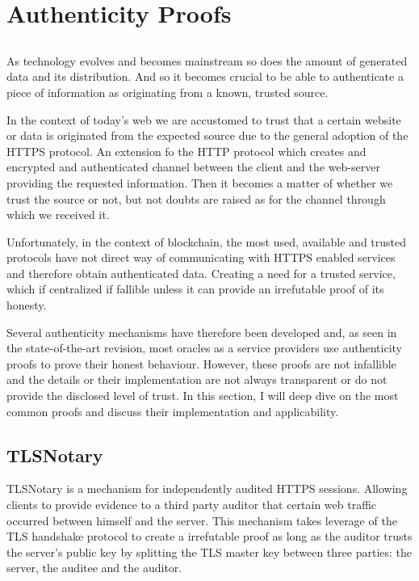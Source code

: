 \chapter{Authenticity Proofs}\label{chap:chap4}

\section*{}
As technology evolves and becomes mainstream so does the amount of generated data and its distribution. And so it becomes crucial to be able to authenticate a piece of information as originating from a known, trusted source. 

In the context of today's web we are accustomed to trust that a certain website or data is originated from the expected source due to the general adoption of the HTTPS protocol. An extension fo the HTTP protocol which creates and encrypted and authenticated channel between the client and the web-server providing the requested information. Then it becomes a matter of whether we trust the source or not, but not doubts are raised as for the channel through which we received it.

Unfortunately, in the context of blockchain, the most used, available and trusted protocols have not direct way of communicating with HTTPS enabled services and therefore obtain authenticated data. Creating a need for a trusted service, which if centralized if fallible unless it can provide an irrefutable proof of its honesty. 

Several authenticity mechanisms have therefore been developed and, as seen in the state-of-the-art revision, most oracles as a service providers use authenticity proofs to prove their honest behaviour. However, these proofs are not infallible and the details or their implementation are not always transparent or do not provide the disclosed level of trust. In this section, I will deep dive on the most common proofs and discuss their implementation and applicability.


\section{TLSNotary}

TLSNotary is a mechanism for independently audited HTTPS sessions. Allowing clients to provide evidence to a third party auditor that certain web traffic occurred between himself and the server. This mechanism takes leverage of the TLS handshake protocol to create a irrefutable proof as long as the auditor trusts the server's public key by splitting the TLS master key between three parties: the server, the auditee and the auditor.

